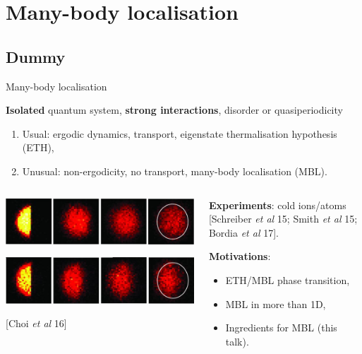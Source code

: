\section{Many-body localisation}
\subsection{Dummy}
\begin{frame}{Many-body localisation}
\begin{block}{\textbf{Isolated} quantum system, \textbf{strong interactions}, disorder or quasiperiodicity}
	\begin{enumerate}
		\item Usual: ergodic dynamics, transport, \textcolor{comp}{eigenstate thermalisation hypothesis (ETH)},
		\item Unusual: non-ergodicity, no transport, \textcolor{BostonBlue}{many-body localisation (MBL)}.
	\end{enumerate}
\end{block}

\begin{columns}
\begin{column}{0.5\textwidth}
\centering
\includegraphics[width=0.9\columnwidth]{img/2_MBL/Imbalance_Choi_thermal}

\includegraphics[width=0.9\columnwidth]{img/2_MBL/Imbalance_Choi}

[Choi \emph{et al} 16]
\end{column}
\begin{column}{0.5\textwidth}
\textbf{Experiments}: cold ions/atoms {\footnotesize[Schreiber \emph{et al} 15; Smith \emph{et al} 15; Bordia \emph{et al} 17]}.

\textbf{Motivations}:
\begin{itemize}
	\item ETH/MBL phase transition,
	\item MBL in more than 1D,
	\item Ingredients for MBL (this talk).
\end{itemize}
\end{column}
\end{columns}
\end{frame}

